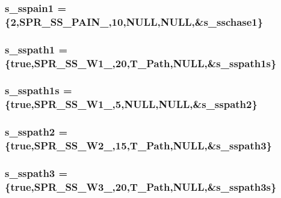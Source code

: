 \label{WL__ACT2_8C_ab483f8908a6f7bdccb624e36aa194b10}
\hypertarget{WL__ACT2_8C_ae06c22cf4b2074ce1fb3225dfd84a54c}{
\subsubsection[{s\_\-sspain1}]{ {\bf s\_\-sspain1} = \{2,SPR\_\-SS\_\-PAIN\_,10,NULL,NULL,\&{\bf s\_\-sschase1}\}}}
\label{WL__ACT2_8C_ae06c22cf4b2074ce1fb3225dfd84a54c}
\hypertarget{WL__ACT2_8C_aa702a1b9c5c53d860c97f3c38641bd36}{
\subsubsection[{s\_\-sspath1}]{ {\bf s\_\-sspath1} = \{true,SPR\_\-SS\_\-W1\_,20,T\_\-Path,NULL,\&{\bf s\_\-sspath1s}\}}}
\label{WL__ACT2_8C_aa702a1b9c5c53d860c97f3c38641bd36}
\hypertarget{WL__ACT2_8C_a424792f55732229257e143b530c4d9d0}{
\subsubsection[{s\_\-sspath1s}]{ {\bf s\_\-sspath1s} = \{true,SPR\_\-SS\_\-W1\_,5,NULL,NULL,\&{\bf s\_\-sspath2}\}}}
\label{WL__ACT2_8C_a424792f55732229257e143b530c4d9d0}
\hypertarget{WL__ACT2_8C_a38a6aacff1eebdbaddc8bbaf9639231f}{
\subsubsection[{s\_\-sspath2}]{ {\bf s\_\-sspath2} = \{true,SPR\_\-SS\_\-W2\_,15,T\_\-Path,NULL,\&{\bf s\_\-sspath3}\}}}
\label{WL__ACT2_8C_a38a6aacff1eebdbaddc8bbaf9639231f}
\hypertarget{WL__ACT2_8C_ad232b5fa4d37725d0cad265b0882032f}{
\subsubsection[{s\_\-sspath3}]{ {\bf s\_\-sspath3} = \{true,SPR\_\-SS\_\-W3\_,20,T\_\-Path,NULL,\&{\bf s\_\-sspath3s}\}}}
